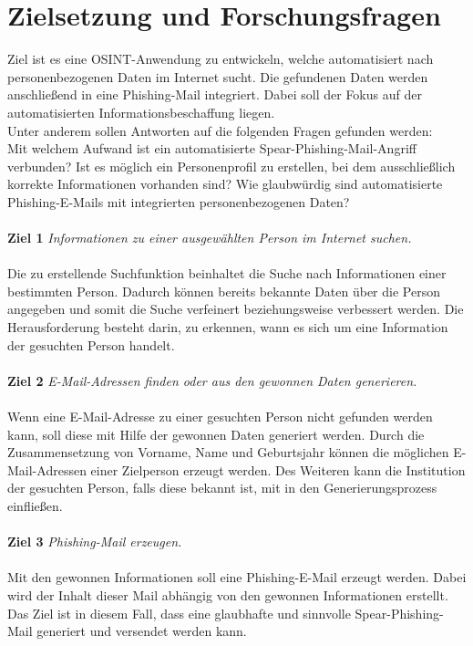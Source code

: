 \section{Zielsetzung und Forschungsfragen}
\label {sec:Zielsetzung}
Ziel ist es eine OSINT-Anwendung zu entwickeln, welche automatisiert nach personenbezogenen Daten im Internet sucht. Die gefundenen Daten werden anschließend in eine Phishing-Mail integriert. Dabei soll der Fokus auf der automatisierten Informationsbeschaffung liegen.\\ 
Unter anderem sollen Antworten auf die folgenden Fragen gefunden werden:\\ Mit welchem Aufwand ist ein automatisierte Spear-Phishing-Mail-Angriff verbunden? Ist es möglich ein Personenprofil zu erstellen, bei dem ausschließlich korrekte Informationen vorhanden sind? Wie glaubwürdig sind automatisierte Phishing-E-Mails mit integrierten personenbezogenen Daten?
 \\\\
 {\bf Ziel 1} \textit{Informationen zu einer ausgewählten Person im Internet suchen.}\\\\
 Die zu erstellende Suchfunktion beinhaltet die Suche nach Informationen einer bestimmten Person. Dadurch können bereits bekannte Daten über die Person angegeben und somit die Suche verfeinert beziehungsweise verbessert werden. Die Herausforderung besteht darin, zu erkennen, wann es sich um eine Information der gesuchten Person handelt.\\\\
 {\bf Ziel 2} \textit{E-Mail-Adressen finden oder aus den gewonnen Daten generieren.}\\\\
 Wenn eine E-Mail-Adresse zu einer gesuchten Person nicht gefunden werden kann, soll diese mit Hilfe der gewonnen Daten generiert werden. Durch die Zusammensetzung von Vorname, Name und Geburtsjahr können die möglichen E-Mail-Adressen einer Zielperson erzeugt werden. Des Weiteren kann die Institution der gesuchten Person, falls diese bekannt ist, mit in den Generierungsprozess einfließen.\\\\
 {\bf Ziel 3} \textit{Phishing-Mail erzeugen.}\\\\
 Mit den gewonnen Informationen soll eine Phishing-E-Mail erzeugt werden. Dabei wird der Inhalt dieser Mail abhängig von den gewonnen Informationen erstellt. Das Ziel ist in diesem Fall, dass eine glaubhafte und sinnvolle Spear-Phishing-Mail generiert und versendet werden kann.
 

